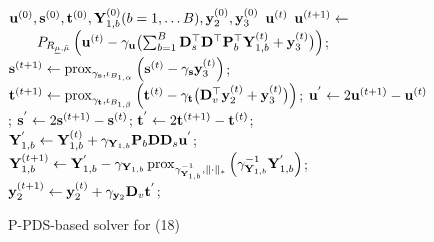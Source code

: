 \begin{figure}[!t]
	\begin{algorithm}[H]
	    \caption{P-PDS-based solver for (18)}
		\label{algo_DPPDS}
		\begin{algorithmic}[1]
			\REQUIRE $\mathbf{u}^{(0)}, \mathbf{s}^{(0)}, \mathbf{t}^{(0)},  \mathbf{Y}_{1,b}^{(0)}(b = 1, \ldots B), \mathbf{y}_{2}^{(0)}, \mathbf{y}_{3}^{(0)}$
			\ENSURE $\mathbf{u}^{(t)}$
    			\STATE $\mathbf{u}^{(t+1)} \leftarrow$ \\ $ \qquad  P_{R_{\underline{\mu},\bar{\mu}}}\left( \mathbf{u}^{(t)} - \gamma_{\mathbf{u}}  \bigl(\sum_{b=1}^{B} \mathbf{D}_{s}^{\top} \mathbf{D}^{\top} \mathbf{P}_{b}^{\top} \mathbf{Y}_{1,b}^{(t)} + \mathbf{y}_{3}^{(t)} \bigr) \right)$;
    			\STATE $\mathbf{s}^{(t+1)} \leftarrow \operatorname{prox}_{\gamma_{\mathbf{s}}, \iota_{B_{1, \alpha}}} \left( \mathbf{s}^{(t)} - \gamma_{\mathbf{s}} \mathbf{y}_{3}^{(t)} \right)$;
                    \STATE $\mathbf{t}^{(t+1)} \leftarrow \operatorname{prox}_{\gamma_{\mathbf{t}}, \iota_{B_{1, \beta}}} \left( \mathbf{t}^{(t)} - \gamma_{\mathbf{t}} \bigl( \mathbf{D}_{v}^{\top} \mathbf{y}_{2}^{(t)} + \mathbf{y}_{3}^{(t)} \bigr) \right)$;
                    \STATE $\mathbf{u}^{'} \leftarrow 2\mathbf{u}^{(t+1)} - \mathbf{u}^{(t)}$;
                    \STATE $\mathbf{s}^{'} \leftarrow 2\mathbf{s}^{(t+1)} - \mathbf{s}^{(t)}$;
                    \STATE $\mathbf{t}^{'} \leftarrow 2\mathbf{t}^{(t+1)} - \mathbf{t}^{(t)}$;
    			    \STATE $\mathbf{Y}_{1,b}^{'} \leftarrow \mathbf{Y}_{1,b}^{(t)} + \gamma_{\mathbf{Y}_{1, b}} \mathbf{P}_{b} \mathbf{D} \mathbf{D}_{s} \mathbf{u}^{'}$;
    			    \STATE $\mathbf{Y}_{1,b}^{(t+1)} \leftarrow \mathbf{Y}_{1,b}^{'} - \gamma_{\mathbf{Y}_{1, b}} \operatorname{prox}_{\gamma_{\mathbf{Y}_{1, b}}^{-1}, \| \cdot \|_{*}} \left(\gamma_{\mathbf{Y}_{1, b}}^{-1} \mathbf{Y}_{1,b}^{'}\right) $;
    		    \ENDFOR
                    \STATE $\mathbf{y}_{2}^{(t+1)} \leftarrow \mathbf{y}_{2}^{(t)} + \gamma_{\mathbf{y}_{2}} \mathbf{D}_{v} \mathbf{t}^{'}$;

\end{algorithmic}
\end{algorithm}
\end{figure}
